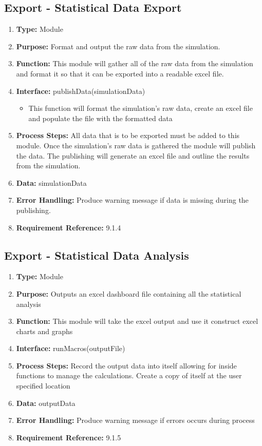 \documentclass[paper=letter, fontsize=10pt]{scrartcl}
\numberwithin{equation}{section}		%
\numberwithin{figure}{section}			%
\numberwithin{table}{section}				%
\begin{document}
\subsection{Export - Statistical Data Export}
\begin{enumerate}[]
	\item \textbf{Type:} Module
	\item \textbf{Purpose:} Format and output the raw data from the simulation.
	\item \textbf{Function:} This module will gather all of the raw data from the simulation and format it  so that it can be exported into a readable excel file.
	\item \textbf{Interface:}
	publishData(simulationData)
	\begin{itemize}
		\item This function will format the simulation's raw data, create an excel file and populate the file with the formatted data
	\end{itemize}
	\item \textbf{Process Steps:} All data that is to be exported must be added to this module.  Once the simulation's raw data is gathered the module will publish the data.  The publishing will generate an excel file and outline the results from the simulation.
	\item \textbf{Data:} simulationData
	\item \textbf{Error Handling:}  Produce warning message if data is missing during the publishing.
	\item \textbf{Requirement Reference:} 9.1.4
\end{enumerate}

\subsection{Export - Statistical Data Analysis}
\begin{enumerate}[]
	\item \textbf{Type:} Module
	\item \textbf{Purpose:} Outputs an excel dashboard file containing all the statistical analysis
	\item \textbf{Function:} This module will take the excel output and use it construct excel charts and graphs  
	\item \textbf{Interface:}
	runMacros(outputFile)
	\item \textbf{Process Steps:} Record the output data into itself allowing for inside functions to manage the calculations. Create a copy of itself at the user specified location
	\item \textbf{Data:} outputData
	\item \textbf{Error Handling:} Produce warning message if errors occurs during process
	\item \textbf{Requirement Reference:} 9.1.5
\end{enumerate}
\end{document}
